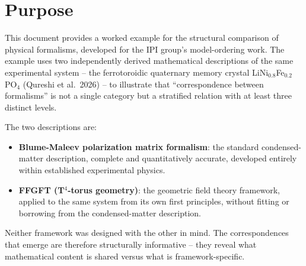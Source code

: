 %
%

\section*{Purpose}

This document provides a worked example for the structural comparison of
physical formalisms, developed for the IPI group's model-ordering work.
The example uses two independently derived mathematical descriptions of the
same experimental system -- the ferrotoroidic quaternary memory crystal
LiNi$_{0.8}$Fe$_{0.2}$PO$_4$ (Qureshi et al.\ 2026) -- to illustrate that
``correspondence between formalisms'' is not a single category but a
stratified relation with at least three distinct levels.

The two descriptions are:
\begin{itemize}
  \item \textbf{Blume-Maleev polarization matrix formalism}: the standard
        condensed-matter description, complete and quantitatively accurate,
        developed entirely within established experimental physics.
  \item \textbf{FFGFT (T$^4$-torus geometry)}: the geometric field theory
        framework, applied to the same system from its own first principles,
        without fitting or borrowing from the condensed-matter description.
\end{itemize}

\noindent Neither framework was designed with the other in mind. The
correspondences that emerge are therefore structurally informative -- they
reveal what mathematical content is shared versus what is framework-specific.

